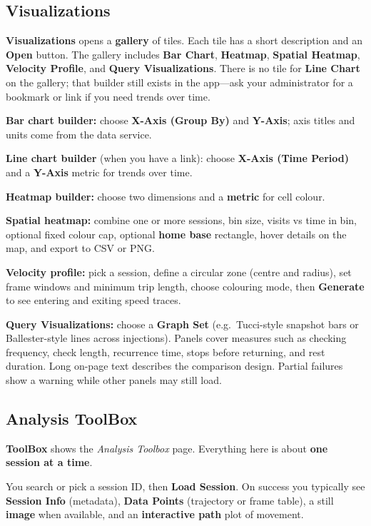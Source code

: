 \documentclass{article}
\begin{document}
\subsection{Visualizations}
\label{subsec:viz-overview}

\textbf{Visualizations} opens a \textbf{gallery} of tiles. Each tile has a short description and an \textbf{Open} button. The gallery includes \textbf{Bar Chart}, \textbf{Heatmap}, \textbf{Spatial Heatmap}, \textbf{Velocity Profile}, and \textbf{Query Visualizations}. There is no tile for \textbf{Line Chart} on the gallery; that builder still exists in the app---ask your administrator for a bookmark or link if you need trends over time.

\textbf{Bar chart builder:} choose \textbf{X-Axis (Group By)} and \textbf{Y-Axis}; axis titles and units come from the data service.

\textbf{Line chart builder} (when you have a link): choose \textbf{X-Axis (Time Period)} and a \textbf{Y-Axis} metric for trends over time.

\textbf{Heatmap builder:} choose two dimensions and a \textbf{metric} for cell colour.

\textbf{Spatial heatmap:} combine one or more sessions, bin size, visits vs time in bin, optional fixed colour cap, optional \textbf{home base} rectangle, hover details on the map, and export to CSV or PNG.

\textbf{Velocity profile:} pick a session, define a circular zone (centre and radius), set frame windows and minimum trip length, choose colouring mode, then \textbf{Generate} to see entering and exiting speed traces.

\textbf{Query Visualizations:} choose a \textbf{Graph Set} (e.g.\ Tucci-style snapshot bars or Ballester-style lines across injections). Panels cover measures such as checking frequency, check length, recurrence time, stops before returning, and rest duration. Long on-page text describes the comparison design. Partial failures show a warning while other panels may still load.

\subsection{Analysis ToolBox}
\label{subsec:toolbox-overview}

\textbf{ToolBox} shows the \emph{Analysis Toolbox} page. Everything here is about \textbf{one session at a time}.

You search or pick a session ID, then \textbf{Load Session}. On success you typically see \textbf{Session Info} (metadata), \textbf{Data Points} (trajectory or frame table), a still \textbf{image} when available, and an \textbf{interactive path} plot of movement.
\end{document}
